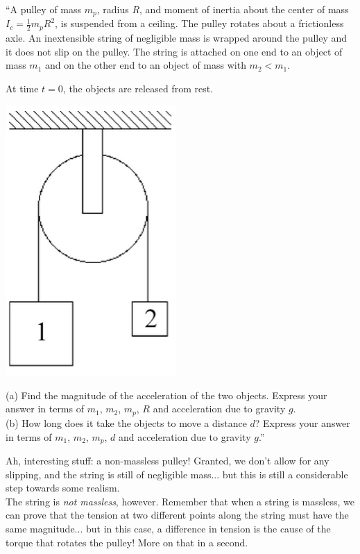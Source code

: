 \documentclass[12pt,a4paper]{report}
\begin{document}
``A pulley of mass $m_p$, radius $R$, and moment of inertia about the center of mass $\displaystyle I_c = \frac{1}{2} m_p R^2$, is suspended from a ceiling. The pulley rotates about a frictionless axle. An inextensible string of negligible mass is wrapped around the pulley and it does not slip on the pulley. The string is attached on one end to an object of mass $m_1$ and on the other end to an object of mass with $m_2 < m_1$.

At time $t = 0$, the objects are released from rest.

\begin{center}
\includegraphics[scale=0.65]{Graphics/h7p3}
\end{center}

(a) Find the magnitude of the acceleration of the two objects. Express your answer in terms of $m_1$, $m_2$, $m_p$, $R$ and acceleration due to gravity $g$.\\
(b) How long does it take the objects to move a distance $d$? Express your answer in terms of $m_1$, $m_2$, $m_p$, $d$ and acceleration due to gravity $g$.''

Ah, interesting stuff: a non-massless pulley! Granted, we don't allow for any slipping, and the string is still of negligible mass... but this is still a considerable step towards some realism.\\
The string is \emph{not massless}, however. Remember that when a string is massless, we can prove that the tension at two different points along the string must have the same magnitude... but in this case, a difference in tension is the cause of the torque that rotates the pulley! More on that in a second.
\end{document}
